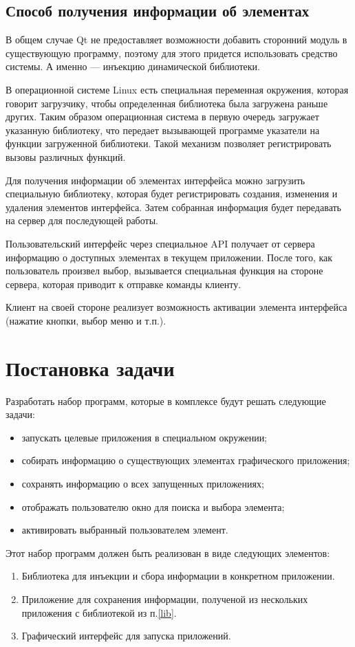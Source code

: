 \subsection{Способ получения информации об элементах}

В общем случае Qt не предоставляет возможности добавить сторонний модуль в
существующую программу, поэтому для этого придется использовать средство
системы. А именно --- инъекцию динамической библиотеки.

В операционной системе Linux есть специальная переменная окружения, которая
говорит загрузчику, чтобы определенная библиотека была загружена раньше других.
Таким образом  операционная система в первую очередь загружает указанную
библиотеку, что передает вызывающей программе указатели на функции загруженной
библиотеки. Такой механизм позволяет регистрировать вызовы различных функций.

Для получения информации об элементах интерфейса можно загрузить специальную
библиотеку, которая будет регистрировать создания, изменения и удаления
элементов интерфейса. Затем собранная информация будет передавать на сервер для
последующей работы.

Пользовательский интерфейс через специальное API получает от сервера информацию
о доступных элементах в текущем приложении. После того, как пользователь
произвел выбор, вызывается специальная функция на стороне сервера, которая
приводит к отправке команды клиенту.

Клиент на своей стороне реализует возможность активации элемента интерфейса
(нажатие кнопки, выбор меню и т.п.).

\section{Постановка задачи}

Разработать набор программ, которые в комплексе будут решать следующие задачи:

\begin{itemize}
	\item запускать целевые приложения в специальном окружении;
	\item собирать информацию о существующих элементах графического приложения;
	\item сохранять информацию о всех запущенных приложениях;
	\item отображать пользователю окно для поиска и выбора элемента;
	\item активировать выбранный пользователем элемент.
\end{itemize}

Этот набор программ должен быть реализован в виде следующих элементов:

\begin{enumerate}
	\item\label{lib} Библиотека для инъекции и сбора информации в конкретном
		приложении.
	\item Приложение для сохранения информации, полученой из нескольких
		приложения с библиотекой из п.\ref{lib}.
	\item Графический интерфейс для запуска приложений.
\end{enumerate}

